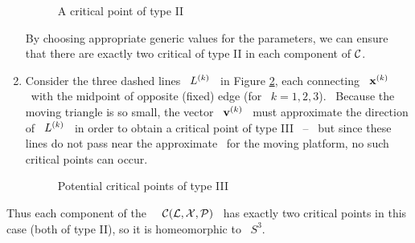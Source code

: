 \begin{example}
\begin{enumerate}
\begin{figure}[htbp]
\begin{center}
\epsfysize=4cm %
\leavevmode {} \caption{A critical point
of type II}\label{fig4}
\end{center}
\end{figure}

By choosing appropriate generic values for the parameters, we can
ensure that there are exactly two critical of type II in each
component of $\mathcal{C}$.

%
\item Consider the three dashed lines \ $L\sp{({k})}$ \ in Figure
  \ref{fig5}, each connecting \ $\mathbf{x}\sp{({k})}$ \ with the midpoint of
  opposite (fixed) edge (for \ $k=1,2,3$). \ Because the moving triangle
  is so small, the vector \ $\mathbf{v}\sp{({k})}$ \ must approximate the direction
  of \ $L\sp{({k})}$ \ in order to obtain a critical point of type III \ --
  \ but since these lines do not pass near the approximate \wspace\
  for the moving platform, no such critical points can occur.

\begin{figure}[htbp]
\begin{center}
\epsfysize=5cm %
\leavevmode {} \caption{Potential
critical points of type III}\label{fig5}
\end{center}
\end{figure}

\end{enumerate}

Thus each component of the \cspace\ \ $\mathcal{C}(\mathcal{L},\mathcal{X},\mathcal{P})$ \ has exactly two critical
points in this case (both of type II), so it is homeomorphic to \ $S^{3}$.
%
\end{example}
